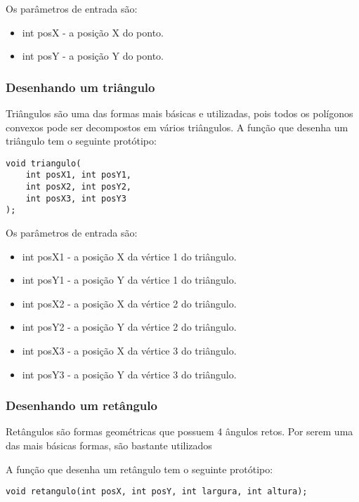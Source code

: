 \documentclass[12pt, %
openright,
oneside, %
a4paper,    %
brazil]{facom-ufu-abntex2}
\begin{document}
Os parâmetros de entrada são:

\begin{itemize}
    \item int posX - a posição X do ponto.
    \item int posY - a posição Y do ponto.
\end{itemize}

\subsubsection{Desenhando um triângulo}
Triângulos são uma das formas mais básicas e utilizadas, pois todos os polígonos convexos pode ser decompostos em vários triângulos. A função que desenha um triângulo tem o seguinte protótipo:

\begin{verbatim}
void triangulo(
    int posX1, int posY1,
    int posX2, int posY2,
    int posX3, int posY3
);
\end{verbatim}

Os parâmetros de entrada são:

\begin{itemize}
    \item int posX1 - a posição X da vértice 1 do triângulo.
    \item int posY1 - a posição Y da vértice 1 do triângulo.

    \item int posX2 - a posição X da vértice 2 do triângulo.
    \item int posY2 - a posição Y da vértice 2 do triângulo.

    \item int posX3 - a posição X da vértice 3 do triângulo.
    \item int posY3 - a posição Y da vértice 3 do triângulo.
\end{itemize}

\subsubsection{Desenhando um retângulo}
Retângulos são formas geométricas que possuem 4 ângulos retos. Por serem uma das mais básicas formas, são bastante utilizados

A função que desenha um retângulo tem o seguinte protótipo:

\begin{verbatim}
void retangulo(int posX, int posY, int largura, int altura);
\end{verbatim}
\end{document}

